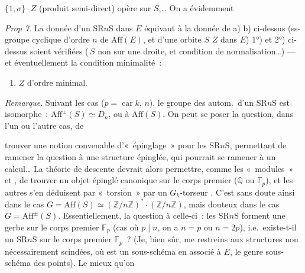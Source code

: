 \documentclass[11pt,a4paper]{article}
\begin{document}
$\{1,\sigma\}\cdot Z$ (produit semi-direct) opère sur $S$,…  On a évidemment \ill{}

\emph{Prop 7}. La donnée d'un  SR$n$S dans $E$ équivaut à la donnée de a) b) ci-dessus (ss-groupe  cyclique d'ordre $n$ de $\mathrm{Aff}(E)$, et d'une orbite $S$  $Z$ dans $E$)   1°) et 2°) ci-dessus soient vérifiées (\,$S$ non sur une droite, et condition de normalisation…) --- et éventuellement la condition minimalité~:
\begin{enumerate}
  \item[3)] $Z$  d'ordre minimal.
\end{enumerate}

\emph{Remarque}. Suivant les cas ($p = \operatorname{car} k$, $n$), le groupe des autom.\ d'un  SR$n$S est isomorphe~: $\mathrm{Aff}^{\pm}(S) \simeq D_n$, ou à $\mathrm{Aff}(S)$. On peut se poser la question, dans l'un ou l'autre cas, de 

trouver une notion convenable d'«~épinglage~»  pour les SR$n$S, permettant de  ramener la question à une structure épinglée, qui pourrait se ramener à un calcul… La théorie de descente devrait alors permettre,  comme les «~modules~» et , de  trouver un objet épinglé canonique sur le corps premier ($\mathbb{Q}$ ou $\mathbb{F}_p$), et les autres s'en déduisent par «~torsion~» par un  $G_k$-torseur . C'est sans doute ainsi dans le cas $G = \mathrm{Aff}(S) \simeq (\mathbb{Z}/n\mathbb{Z})^{*}\cdot(\mathbb{Z}/n\mathbb{Z})$, mais douteux dans le cas $G = \mathrm{Aff}^{\pm}(S)$. Essentiellement, la question  à celle-ci~: les SR$n$S  forment une gerbe sur le corps premier $\mathbb{F}_p$ (cas où $p \mid n$, on a $n = p$  ou $n = 2p$), \struck{\ill{}}   i.e.\ existe-t-il un SR$n$S sur le corps premier $\mathbb{F}_p$~? (Je, bien sûr, me restreins aux structures non nécessairement scindées, où \ill{} est un sous-schéma en  associé à $E$, le genre sous-schéma \ill{} des points). Le mieux qu'on
\end{document}
